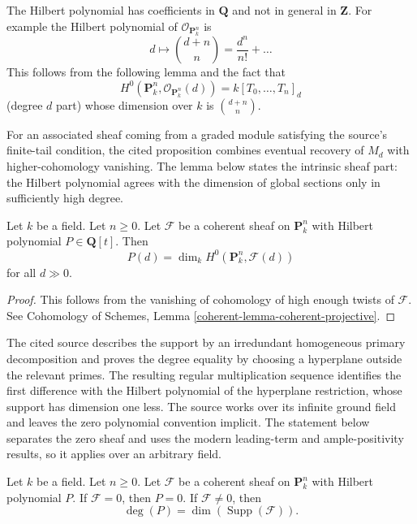 \noindent
The Hilbert polynomial has coefficients in $\mathbf{Q}$ and not
in general in $\mathbf{Z}$. For example the Hilbert polynomial
of $\mathcal{O}_{\mathbf{P}^n_k}$ is
$$
d \longmapsto {d + n \choose n} = \frac{d^n}{n!} + \ldots
$$
This follows from the following lemma and the fact that
$$
H^0(\mathbf{P}^n_k, \mathcal{O}_{\mathbf{P}^n_k}(d)) = k[T_0, \ldots, T_n]_d
$$
(degree $d$ part) whose dimension over $k$ is ${d + n \choose n}$.

\begin{lemma}
\label{lemma-hilbert-polynomial-H0}
\begin{reference}
\cite[Chapter III, \S 6, no. 80, Proposition 4, pp. 275--276]{FAC}
\end{reference}
\begin{history}
For an associated sheaf coming from a graded module satisfying the source's
finite-tail condition, the cited proposition combines eventual recovery of
$M_d$ with higher-cohomology vanishing. The lemma below states the intrinsic
sheaf part: the Hilbert polynomial agrees with the dimension of global
sections only in sufficiently high degree.
\end{history}
Let $k$ be a field. Let $n \geq 0$. Let $\mathcal{F}$ be a coherent sheaf
on $\mathbf{P}^n_k$ with Hilbert polynomial $P \in \mathbf{Q}[t]$.
Then
$$
P(d) = \dim_k H^0(\mathbf{P}^n_k, \mathcal{F}(d))
$$
for all $d \gg 0$.
\end{lemma}

\begin{proof}
This follows from the vanishing of cohomology of high enough twists
of $\mathcal{F}$. See
Cohomology of Schemes,
Lemma \ref{coherent-lemma-coherent-projective}.
\end{proof}

\begin{lemma}
\label{lemma-hilbert-polynomial-degree-support}
\begin{reference}
\cite[Chapter III, \S 6, no. 81, Proposition 6 and proof,
pp. 276--277]{FAC}
\end{reference}
\begin{history}
The cited source describes the support by an irredundant homogeneous primary
decomposition and proves the degree equality by choosing a hyperplane outside
the relevant primes. The resulting regular multiplication sequence identifies
the first difference with the Hilbert polynomial of the hyperplane
restriction, whose support has dimension one less. The source works over its
infinite ground field and leaves the zero polynomial convention implicit. The
statement below separates the zero sheaf and uses the modern leading-term and
ample-positivity results, so it applies over an arbitrary field.
\end{history}
Let $k$ be a field. Let $n \geq 0$. Let $\mathcal{F}$ be a coherent sheaf
on $\mathbf{P}^n_k$ with Hilbert polynomial $P$. If $\mathcal{F} = 0$, then
$P = 0$. If $\mathcal{F} \not = 0$, then
$$
\deg(P) = \dim(\operatorname{Supp}(\mathcal{F})).
$$
\end{lemma}

